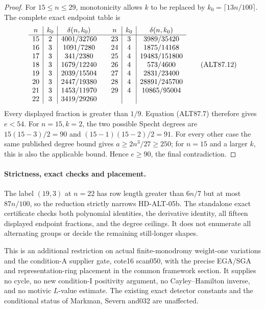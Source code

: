 \begin{proof}
For $15\le n\le29$, monotonicity allows $k$ to be replaced by
$k_0=\lceil13n/100\rceil$. The complete exact endpoint table is
\[
\begin{array}{c|c|c@{\qquad}c|c|c}
n&k_0&\delta(n,k_0)&n&k_0&\delta(n,k_0)\\\hline
15&2&4001/32760&23&3&3989/35420\\
16&3&1091/7280&24&4&1875/14168\\
17&3&341/2380&25&4&19483/151800\\
18&3&1679/12240&26&4&573/4600\\
19&3&2039/15504&27&4&2831/23400\\
20&3&2447/19380&28&4&28891/245700\\
21&3&1453/11970&29&4&10865/95004\\
22&3&3419/29260&&&
\end{array}                                                     \tag{ALT87.12}
\]
Every displayed fraction is greater than $1/9$. Equation (ALT87.7)
therefore gives $e<54$. For $n=15,k=2$, the two possible Specht
degrees are $15(15-3)/2=90$ and $(15-1)(15-2)/2=91$.
For every other case the same published degree bound gives
$a\ge2n^3/27\ge250$; for $n=15$ and a larger $k$, this is also
the applicable bound. Hence $e\ge90$, the final contradiction.
\end{proof}

\paragraph{Strictness, exact checks and placement.}
The label $(19,3)$ at $n=22$ has row length greater than $6n/7$
but at most $87n/100$, so the reduction strictly narrows HD-ALT-05b.
The standalone exact certificate checks both polynomial identities,
the derivative identity, all fifteen displayed endpoint fractions,
and the degree ceilings. It does not enumerate all alternating groups
or decide the remaining still-longer shapes.

This is an additional restriction on actual finite-monodromy
weight-one variations and the condition-A supplier gate, cote16
scan050, with the precise EGA/SGA and representation-ring placement
in the common framework section. It supplies no cycle, no new
condition-I positivity argument, no Cayley--Hamilton inverse, and
no motivic $L$-value estimate. The existing exact detector constants
and the conditional status of Markman, Severn and032 are unaffected.
